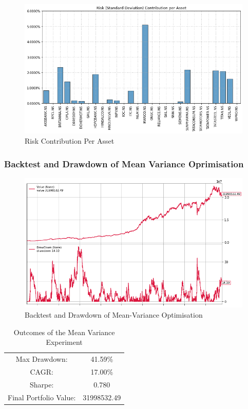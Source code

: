 \begin{figure}[H]
\centering
   \includegraphics[width=1.0\textwidth]{MV/Risk.png}
      \caption{Risk Contribution Per Asset}
       \label{MV_Risk}
\end{figure}

\subsubsection{Backtest and Drawdown of Mean Variance Oprimisation}

\begin{figure}[H]
\centering
   \includegraphics[width=1.0\textwidth]{MV/Backtest.png}
      \caption{Backtest and Drawdown of Mean-Variance Optimisation}
       \label{MV_backtest}
\end{figure}

\begin{table}[H]
\centering
\begin{tabular}{|c | c|} 
 \hline
 Max Drawdown: &41.59\%\\
CAGR: &17.00\%\\
Sharpe: &0.780\\
Final Portfolio Value: &31998532.49\\
 \hline
\end{tabular}
\caption{Outcomes of the Mean Variance Experiment}
\label{MV outcome table}
\end{table}

